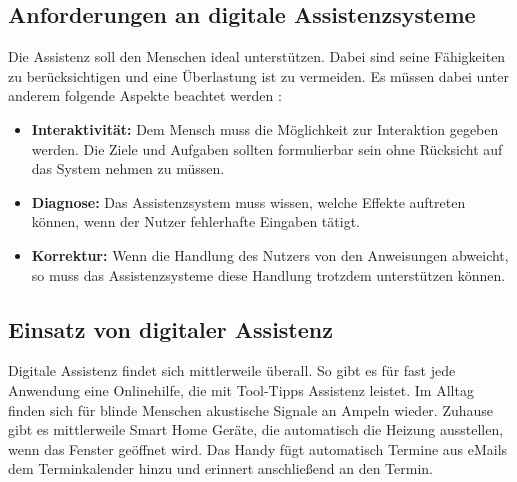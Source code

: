 \subsection{Anforderungen an digitale Assistenzsysteme}
Die Assistenz soll den Menschen ideal unterstützen. Dabei sind seine Fähigkeiten zu berücksichtigen und eine Überlastung ist zu vermeiden. Es müssen dabei unter anderem folgende Aspekte beachtet werden \cite{Ludwig}:
\begin{itemize}
\item \textbf{Interaktivität:} Dem Mensch muss die Möglichkeit zur Interaktion gegeben werden. Die Ziele und Aufgaben sollten formulierbar sein ohne Rücksicht auf das System nehmen zu müssen.
\item \textbf{Diagnose:} Das Assistenzsystem muss wissen, welche Effekte auftreten können, wenn der Nutzer fehlerhafte Eingaben tätigt.
\item \textbf{Korrektur:} Wenn die Handlung des Nutzers von den Anweisungen abweicht, so muss das Assistenzsysteme diese Handlung trotzdem unterstützen können.
\end{itemize}

\subsection{Einsatz von digitaler Assistenz}
Digitale Assistenz findet sich mittlerweile überall. So gibt es für fast jede Anwendung eine Onlinehilfe, die mit Tool-Tipps Assistenz leistet. Im Alltag finden sich für blinde Menschen akustische Signale an Ampeln wieder. Zuhause gibt es mittlerweile Smart Home Geräte, die automatisch die Heizung ausstellen, wenn das Fenster geöffnet wird. Das Handy fügt automatisch Termine aus eMails dem Terminkalender hinzu und erinnert anschließend an den Termin.

